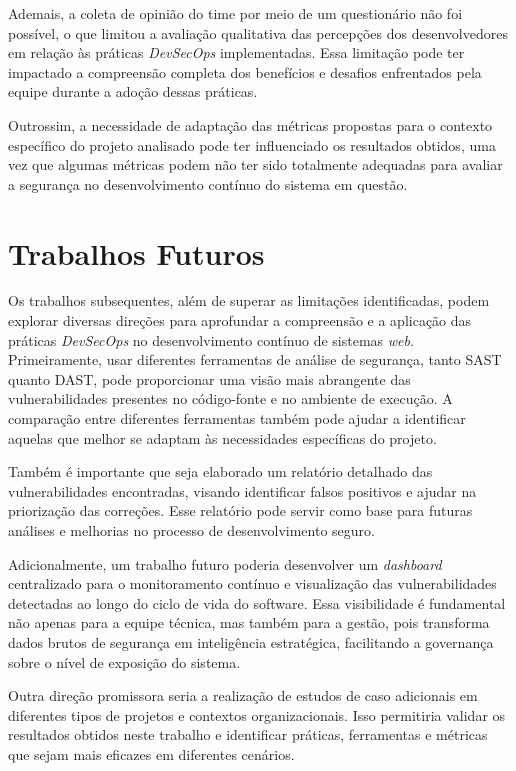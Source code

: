 Ademais, a coleta de opinião do time por meio de um questionário não foi possível, o que limitou a avaliação qualitativa das percepções dos desenvolvedores em relação às práticas \textit{DevSecOps} implementadas. Essa limitação pode ter impactado a compreensão completa dos benefícios e desafios enfrentados pela equipe durante a adoção dessas práticas.

Outrossim, a necessidade de adaptação das métricas propostas para o contexto específico do projeto analisado pode ter influenciado os resultados obtidos, uma vez que algumas métricas podem não ter sido totalmente adequadas para avaliar a segurança no desenvolvimento contínuo do sistema em questão.

\section{Trabalhos Futuros}

Os trabalhos subsequentes, além de superar as limitações identificadas, podem explorar diversas direções para aprofundar a compreensão e a aplicação das práticas \textit{DevSecOps} no desenvolvimento contínuo de sistemas \textit{web}. Primeiramente, usar diferentes ferramentas de análise de segurança, tanto SAST quanto DAST, pode proporcionar uma visão mais abrangente das vulnerabilidades presentes no código-fonte e no ambiente de execução. A comparação entre diferentes ferramentas também pode ajudar a identificar aquelas que melhor se adaptam às necessidades específicas do projeto.

Também é importante que seja elaborado um relatório detalhado das vulnerabilidades encontradas, visando identificar falsos positivos e ajudar na priorização das correções. Esse relatório pode servir como base para futuras análises e melhorias no processo de desenvolvimento seguro.

Adicionalmente, um trabalho futuro poderia desenvolver um \textit{dashboard} centralizado para o monitoramento contínuo e visualização das vulnerabilidades detectadas ao longo do ciclo de vida do software. Essa visibilidade é fundamental não apenas para a equipe técnica, mas também para a gestão, pois transforma dados brutos de segurança em inteligência estratégica, facilitando a governança sobre o nível de exposição do sistema.

Outra direção promissora seria a realização de estudos de caso adicionais em diferentes tipos de projetos e contextos organizacionais. Isso permitiria validar os resultados obtidos neste trabalho e identificar práticas, ferramentas e métricas que sejam mais eficazes em diferentes cenários.